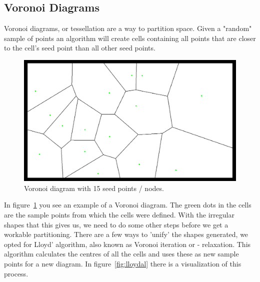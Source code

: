 \documentclass[11pt,a4paper,twocolumn]{article}
\begin{document}
\subsection{Voronoi Diagrams}
Voronoi diagrams, or tessellation are a way to partition space. Given a "random" sample of points an algorithm will create cells containing all points that are closer to the cell's seed point than all other seed points. 
\begin{figure}[h!]
	\centering
		\includegraphics[scale=.2]{images/voronoi-unrelaxed}
		\caption{Voronoi diagram with 15 seed points / nodes.}
	\label{fig:pccs:voronoi}
\end{figure}
In figure~\ref{fig:pccs:voronoi} you see an example of a Voronoi diagram. The green dots in the cells are the sample points from which the cells were defined. With the irregular shapes that this gives us, we need to do some other steps before we get a workable partitioning. There are a few ways to 'unify' the shapes generated, we opted for Lloyd' algorithm, also known as Voronoi iteration or - relaxation. This algorithm calculates the centres of all the cells and uses these as new sample points for a new diagram. In figure~\ref{fig:lloydal} there is a visualization of this process.
\end{document}
